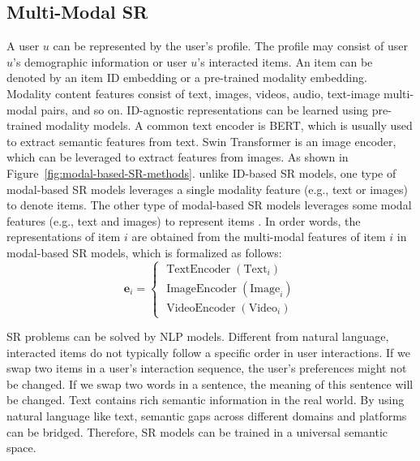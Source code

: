 \documentclass[review]{fcs}
\begin{document}
	\subsection{Multi-Modal SR}\label{sec:multi_modal_SR}
	A user $u$ can be represented by the user’s profile. The profile may consist of user $u$’s demographic information or user $u$’s interacted items. An item can be denoted by an item ID embedding or a pre-trained modality embedding. Modality content features consist of text, images, videos, audio, text-image multi-modal pairs, and so on. ID-agnostic representations can be learned using pre-trained modality models. A common text encoder is BERT, which is usually used to extract semantic features from text. Swin Transformer is an image encoder, which can be leveraged to extract features from images. As shown in Figure~\ref{fig:modal-based-SR-methods}. unlike ID-based SR models, one type of modal-based SR models leverages a single modality feature (e.g., text or images) to denote items. The other type of modal-based SR models leverages some modal features (e.g., text and images) to represent items \cite{ODMT}. In order words, the representations of item $i$ are obtained from the multi-modal features of item $i$ in modal-based SR models, which is formalized as follows:
	\begin{equation}
		\mathbf{e}_i=\left\{\begin{array}{l}
			\operatorname{TextEncoder}(\text{Text}_{i}) \\
			\operatorname{ImageEncoder}(\text{Image}_{i}) \\
			\operatorname{VideoEncoder}(\text{Video}_{i})
		\end{array}\right.
	\end{equation}
	
	SR problems can be solved by NLP models. Different from natural language, interacted items do not typically follow a specific order in user interactions. If we swap two items in a user's interaction sequence, the user’s preferences might not be changed. If we swap two words in a sentence, the meaning of this sentence will be changed. Text contains rich semantic information in the real world. By using natural language like text, semantic gaps across different domains and platforms can be bridged. Therefore, SR models can be trained in a universal semantic space.
	
\end{document}
